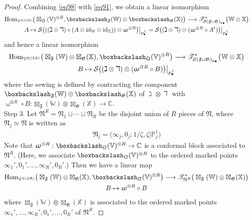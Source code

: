 \documentclass[11pt,b5paper,notitlepage]{article}
\theoremstyle{definition}
\theoremstyle{plain}
\newcommand{\tr}{\mathrm{t}} %
\newcommand{\Hom}{\mathrm{Hom}}
\newcommand{\blt}{\bullet}
\newcommand{\Vbb}{\mathbb V}
\newcommand{\Xbb}{\mathbb X}
\newcommand{\Wbb}{\mathbb W}
\newcommand{\Cbb}{\mathbb C}
\newcommand{\Pbb}{\mathbb P}
\newcommand{\<}{\left\langle}
\renewcommand{\>}{\right\rangle}
\newcommand{\ST}{\mathscr{T}}
\newcommand{\MS}{\mathcal{S}}
\newcommand{\bbs}{\boxbackslash}
\newcommand{\fq}{{\mathfrak Q}}
\newcommand{\id}{\mathrm{id}}
\newcommand{\fn}{\mathfrak{N}}
\newcommand{\ff}{\mathfrak{F}}
\newcommand{\fg}{\mathfrak{G}}
\numberwithin{equation}{section}
\begin{document}
\begin{proof}
Combining \eqref{eq98} with \eqref{eq91}, we obtain a linear isomorphism
\begin{gather*}
\Hom_{\Vbb^{\otimes(2R)}}\big(\boxtimes_\fq(\Vbb)^{\otimes R},\bbs_\ff(\Wbb)\otimes\bbs_\fg(\Xbb) \big)\longrightarrow\ST^*_{\MS(\ff\sqcup\fg)_{p_\blt}}\big(\Wbb\otimes\Xbb\big)\\
A\mapsto \MS\big(((\gimel\otimes\daleth)\circ (A\otimes\id_\Wbb\otimes\id_\Xbb))\otimes\upomega^{\otimes R}\big)\big|_{p^\pm_\blt}=\MS\big((\gimel\otimes\daleth)\otimes(\upomega^{\otimes R}\circ A^\tr)\big)\big|_{p^\pm_\blt}
\end{gather*}
and hence a linear isomorphism
\begin{gather}\label{eq92}
\begin{gathered}
\Hom_{\Vbb^{\otimes(2R)}}\big(\boxtimes_\ff(\Wbb)\otimes\boxtimes_\fg(\Xbb),\bbs_\fq(\Vbb)^{\otimes R}\big)\longrightarrow\ST^*_{\MS(\ff\sqcup\fg)_{p_\blt}}\big(\Wbb\otimes\Xbb\big)\\
B\mapsto \MS\big((\gimel\otimes\daleth)\otimes(\upomega^{\otimes R}\circ B)\big)\big|_{p^\pm_\blt}
\end{gathered}
\end{gather}
where the sewing is defined by contracting the component $\bbs_\ff(\Wbb)\otimes\bbs_\fg(\Xbb)$ of  $\gimel\otimes\daleth$ with $\upomega^{\otimes R}\circ B:\boxtimes_\ff(\Wbb)\otimes\boxtimes_\fg(\Xbb)\rightarrow\Cbb$.\\[-1ex]


Step 3. Let $\fn^R=\fn_1\sqcup\cdots\sqcup\fn_R$ be the disjoint union of $R$ pieces of $\fn$, where $\fn_j\simeq\fn$ is written as
\begin{align*}
\fn_j=\big(\infty_j,0_j;1/\zeta,\zeta|\Pbb^1_j\big)
\end{align*}
Note that $\upomega^{\otimes R}:\bbs_\fq(\Vbb)^{\otimes R}\rightarrow\Cbb$ is a conformal block associated to $\fn^R$. (Here, we associate $\bbs_\fq(\Vbb)^{\otimes R}$ to the ordered marked points $\infty_1',0_1',\dots,\infty_R',0_R'$.) Then we have a linear map
\begin{gather}\label{eq90}
\begin{gathered}
\Hom_{\Vbb^{\otimes(2R)}}\big(\boxtimes_\ff(\Wbb)\otimes\boxtimes_\fg(\Xbb),\bbs_\fq(\Vbb)^{\otimes R}\big)\longrightarrow \ST^*_{\fn^R}\big(\boxtimes_\ff(\Wbb)\otimes\boxtimes_\fg(\Xbb)\big)\\
B\mapsto \upomega^{\otimes R}\circ B
\end{gathered}
\end{gather}
where $\boxtimes_\ff(\Wbb)\otimes\boxtimes_\fg(\Xbb)$ is associated to the ordered marked points $\infty_1',\dots,\infty_R',0_1',\dots,0_R'$ of $\fn^R$.


\end{proof}
\end{document}
